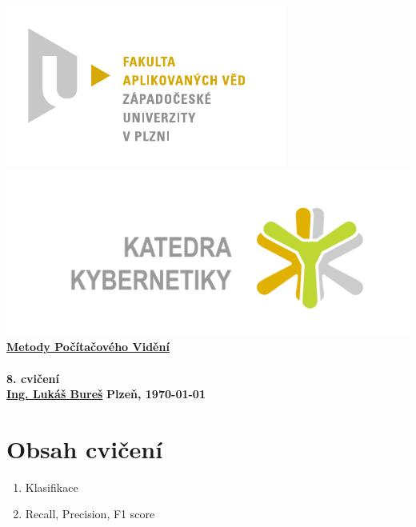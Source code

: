 \documentclass[12pt, a4paper]{article}
\newcommand{\cisloCviceni}{8. cvičení}
\begin{document}
 









 
\begin{titlepage}
\begin{center}
	\includegraphics[trim = 0.6cm 0.5cm 0.9cm 0.5cm, scale=1]{./FAV_logo_cz.pdf}
	\hspace*{\fill}
	\includegraphics[trim = 3.5cm 1.5cm 2.6cm 2cm, scale=0.295]{./KKY_logo_cz.pdf}\\
	\vspace*{\fill}
	\textbf{\Huge{\href{http://www.kky.zcu.cz/cs/courses/mpv}{Metody Počítačového Vidění} \\ ~ \\ \cisloCviceni}}\\
	\vspace*{\fill}
	\textbf{\large{\href{mailto:LBures@kky.zcu.cz}{Ing. Lukáš Bureš}}} \hfill \textbf{\large{Plzeň, \today}}
\end{center}
\end{titlepage}












\section*{Obsah cvičení}
\begin{enumerate}
	\item Klasifikace
	\item Recall, Precision, F1 score
\end{enumerate}
\end{document}
